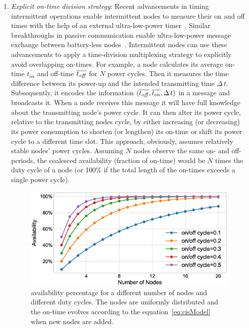 \begin{enumerate}[label=\roman*.]%
%
		\item \textit{Explicit on-time division strategy}: Recent advancements in timing intermittent operations enable intermittent nodes to measure their on and off times with the help of an external ultra-low-power timer~\cite{hester2017timely}. Similar breakthroughs in passive communication enable ultra-low-power message exchange between battery-less nodes~\cite{li2015retro}. Intermittent nodes can use these advancements to apply a time-division multiplexing strategy to explicitly avoid overlapping on-times. For example, a node calculates its average on-time $\overline{t_{on}}$ and off-time $\overline{t_{\it off}}$ for $N$ power cycles. Then it measures the time difference between its power-up and the intended transmitting time $\Delta\,t$. Subsequently, it encodes the information $({\overline{t_{\it off}}, \overline{t_{on}}, \Delta\,t})$ in a message and broadcasts it. When a node receives this message it will have full knowledge about the transmitting node's power cycle. It can then alter its power cycle, relative to the transmitting nodes cycle, by either increasing (or decreasing) its power consumption to shorten (or lengthen) its on-time or shift its power cycle to a different time slot. This approach, obviously, assumes relatively stable nodes' power cycles. Assuming $N$ nodes observe the same on- and off- periods, the coalesced availability (fraction of on-time) would be $N$ times the duty cycle of a node (or 100\% if the total length of the on-times exceeds a single power cycle).
%
\begin{figure}
		\centering
		\includegraphics[width=\columnwidth]{figures/cisModel}
		\caption{\fullsys availability percentage for a different number of nodes and different duty cycles. The nodes are uniformly distributed and the \sys on-time evolves according to the equation~\ref{eq:cisModel} when new nodes are added.}

\end{figure}
\end{enumerate}
